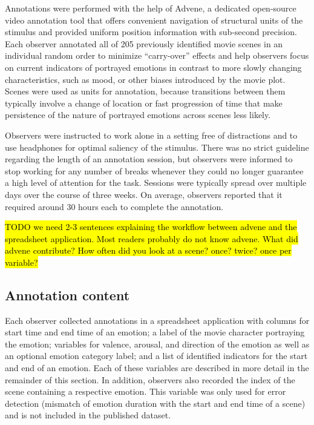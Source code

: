 \documentclass[10pt,a4paper,twocolumn]{article}
\begin{document}
Annotations were performed with the help of Advene\cite{AP2005}, a dedicated
open-source video annotation tool that offers convenient navigation of
structural units of the stimulus and provided uniform position information with
sub-second precision. Each observer annotated all of 205 previously identified
movie scenes in an individual random order to minimize ``carry-over'' effects
and help observers focus on current indicators of portrayed emotions in
contrast to more slowly changing characteristics, such as mood, or other biases
introduced by the movie plot. Scenes were used as units for annotation, because
transitions between them typically involve a change of location or fast
progression of time that make persistence of the nature of portrayed emotions
across scenes less likely.

Observers were instructed to work alone in a setting free of distractions and
to use headphones for optimal saliency of the stimulus. There was no strict
guideline regarding the length of an annotation session, but observers were
informed to stop working for any number of breaks whenever they could no longer
guarantee a high level of attention for the task. Sessions were typically
spread over multiple days over the course of three weeks. On average, observers
reported that it required around 30 hours each to complete the annotation.

\hl{TODO we need 2-3 sentences explaining the workflow between advene and the
spreadsheet application. Most readers probably do not know advene. What did
advene contribute? How often did you look at a scene? once? twice? once per
variable?}

\subsection*{Annotation content}

Each observer collected annotations in a spreadsheet application with columns
for start time and end time of an emotion; a label of the movie character
portraying the emotion; variables for valence, arousal, and direction of the
emotion as well as an optional emotion category label; and a list of
identified indicators for the start and end of an emotion. Each of these
variables are described in more detail in the remainder of this section. In
addition, observers also recorded the index of the scene containing a
respective emotion. This variable was only used for error detection (mismatch
of emotion duration with the start and end time of a scene) and is not included
in the published dataset.
\end{document}
